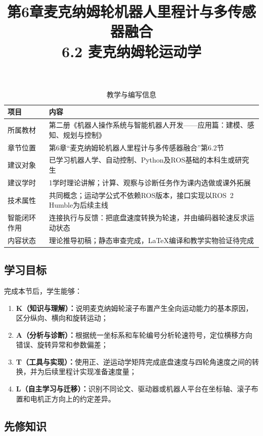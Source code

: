 \documentclass[UTF8,zihao=-4]{ctexart}
\title{第6章麦克纳姆轮机器人里程计与多传感器融合\\
\large 6.2 麦克纳姆轮运动学}
\author{}
\date{}
\begin{document}
\maketitle

\begin{table}[htbp]
  \centering
  \caption*{教学与编写信息}
  \begin{tabular}{p{}p{}}
    \toprule
    项目 & 内容 \\
    \midrule
    所属教材 & 第二册《机器人操作系统与智能机器人开发——应用篇：建模、感知、规划与控制》 \\
    章节位置 & 第6章“麦克纳姆轮机器人里程计与多传感器融合”第6.2节 \\
    建议对象 & 已学习机器人学、自动控制、Python及ROS基础的本科生或研究生 \\
    建议学时 & 1学时理论讲解；计算、观察与诊断任务作为课内选做或课外拓展 \\
    技术属性 & 共同概念；运动学公式不依赖ROS版本，接口实现以ROS~2 Humble为后续主线 \\
    智能闭环作用 & 连接执行与反馈：把底盘速度转换为轮速，并由编码器轮速反求运动状态 \\
    内容状态 & 理论推导初稿；静态审查完成，LaTeX编译和教学实物验证待完成 \\
    \bottomrule
  \end{tabular}
\end{table}

\subsection*{学习目标}

完成本节后，学生能够：
\begin{enumerate}
  \item \textbf{K（知识与理解）：}说明麦克纳姆轮滚子布置产生全向运动能力的基本原因，区分纵向、横向和旋转运动；
  \item \textbf{A（分析与诊断）：}根据统一坐标系和车轮编号分析轮速符号，定位横移方向错误、旋转异常和参数偏差；
  \item \textbf{T（工具与实现）：}使用正、逆运动学矩阵完成底盘速度与四轮角速度之间的转换，并为后续里程计实现准备速度量；
  \item \textbf{L（自主学习与迁移）：}识别不同论文、驱动器或机器人平台在坐标轴、滚子布置和电机正方向上的约定差异。
\end{enumerate}

\subsection*{先修知识}
\end{document}

